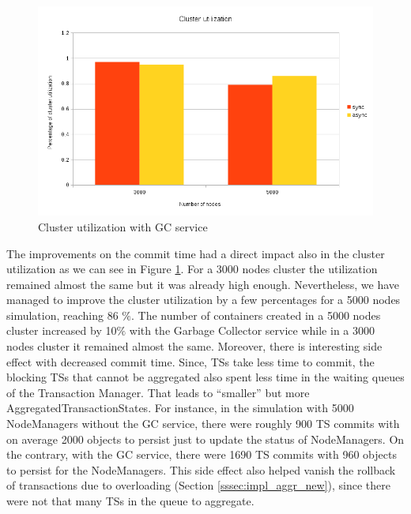\begin{figure}
\centering
\includegraphics[scale=0.7]{resources/images/Evaluation/cluster_util_sync_async.png}
\caption{Cluster utilization with GC service}
\label{fig:ev_cluster_util_sync_async}
\end{figure}

The improvements on the commit time had a direct impact also in the
cluster utilization as we can see in Figure
\ref{fig:ev_cluster_util_sync_async}. For a 3000 nodes cluster the
utilization remained almost the same but it was already high
enough. Nevertheless, we have managed to improve the cluster
utilization by a few percentages for a 5000 nodes simulation, reaching
86 $\%$. The number of containers created in a 5000 nodes cluster
increased by 10$\%$ with the Garbage Collector service while in a 3000
nodes cluster it remained almost the same. Moreover, there is interesting
side effect with decreased commit time. Since, TSs take less time to
commit, the blocking TSs that cannot be aggregated also spent less
time in the waiting queues of the Transaction Manager. That leads to
``smaller'' but more AggregatedTransactionStates. For instance, in the
simulation with 5000 NodeManagers without the GC service, there were
roughly 900 TS commits with on average 2000 objects to persist just
to update the status of NodeManagers. On the contrary, with the GC
service, there were 1690 TS commits with 960 objects to persist for
the NodeManagers. This side effect also helped vanish the rollback of
transactions due to overloading (Section \ref{sssec:impl_aggr_new}), 
since there were not that many TSs in the queue to aggregate.